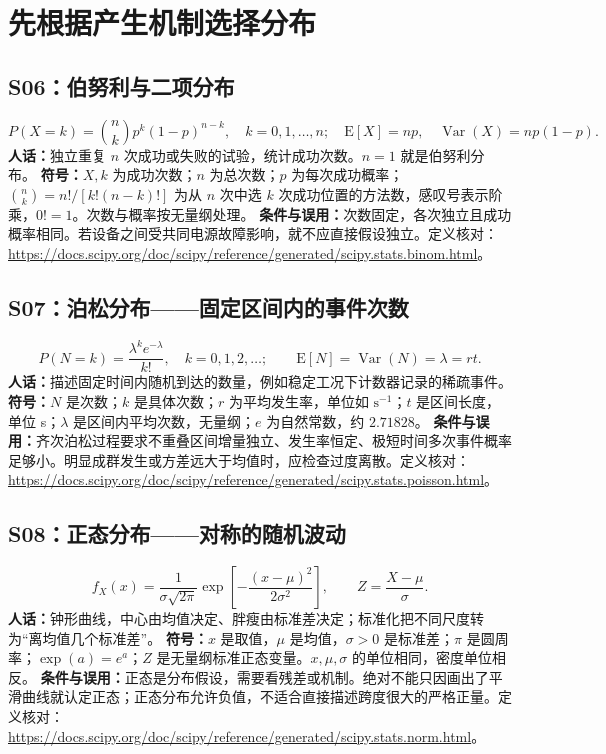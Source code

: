 \section{先根据产生机制选择分布}
\subsection{S06：伯努利与二项分布}
\begin{equation}
 P(X=k)=\binom{n}{k}p^k(1-p)^{n-k},\quad k=0,1,\ldots,n;
 \quad \mathrm{E}[X]=np,\quad\operatorname{Var}(X)=np(1-p).
\end{equation}
\textbf{人话：}独立重复 $n$ 次成功或失败的试验，统计成功次数。$n=1$ 就是伯努利分布。
\textbf{符号：}$X,k$ 为成功次数；$n$ 为总次数；$p$ 为每次成功概率；$\binom{n}{k}=n!/[k!(n-k)!]$ 为从 $n$ 次中选 $k$ 次成功位置的方法数，感叹号表示阶乘，$0!=1$。次数与概率按无量纲处理。
\textbf{条件与误用：}次数固定，各次独立且成功概率相同。若设备之间受共同电源故障影响，就不应直接假设独立。定义核对：\url{https://docs.scipy.org/doc/scipy/reference/generated/scipy.stats.binom.html}。

\subsection{S07：泊松分布——固定区间内的事件次数}
\begin{equation}
 P(N=k)=\frac{\lambda^k e^{-\lambda}}{k!},\quad k=0,1,2,\ldots;
 \qquad \mathrm{E}[N]=\operatorname{Var}(N)=\lambda=rt.
\end{equation}
\textbf{人话：}描述固定时间内随机到达的数量，例如稳定工况下计数器记录的稀疏事件。
\textbf{符号：}$N$ 是次数；$k$ 是具体次数；$r$ 为平均发生率，单位如 $\mathrm{s}^{-1}$；$t$ 是区间长度，单位 s；$\lambda$ 是区间内平均次数，无量纲；$e$ 为自然常数，约 $2.71828$。
\textbf{条件与误用：}齐次泊松过程要求不重叠区间增量独立、发生率恒定、极短时间多次事件概率足够小。明显成群发生或方差远大于均值时，应检查过度离散。定义核对：\url{https://docs.scipy.org/doc/scipy/reference/generated/scipy.stats.poisson.html}。

\subsection{S08：正态分布——对称的随机波动}
\begin{equation}
 f_X(x)=\frac{1}{\sigma\sqrt{2\pi}}\exp\!\left[-\frac{(x-\mu)^2}{2\sigma^2}\right],\qquad Z=\frac{X-\mu}{\sigma}.
\end{equation}
\textbf{人话：}钟形曲线，中心由均值决定、胖瘦由标准差决定；标准化把不同尺度转为“离均值几个标准差”。
\textbf{符号：}$x$ 是取值，$\mu$ 是均值，$\sigma>0$ 是标准差；$\pi$ 是圆周率；$\exp(a)=e^a$；$Z$ 是无量纲标准正态变量。$x,\mu,\sigma$ 的单位相同，密度单位相反。
\textbf{条件与误用：}正态是分布假设，需要看残差或机制。绝对不能只因画出了平滑曲线就认定正态；正态分布允许负值，不适合直接描述跨度很大的严格正量。定义核对：\url{https://docs.scipy.org/doc/scipy/reference/generated/scipy.stats.norm.html}。

